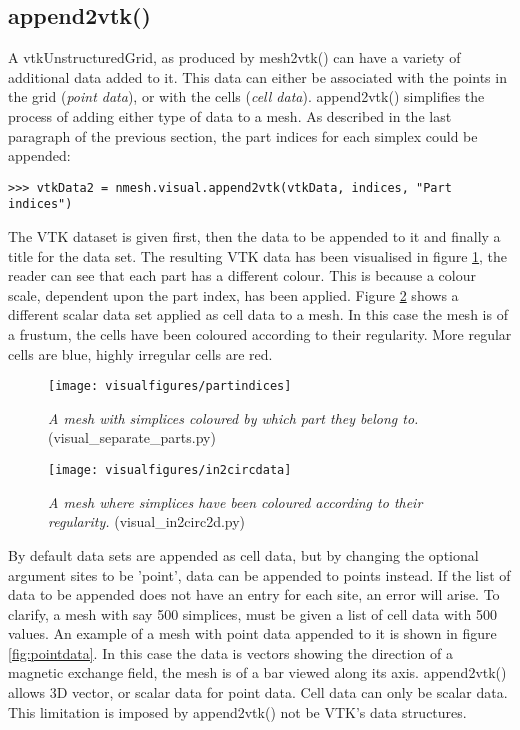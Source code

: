\subsection{{\ttfamily append2vtk()}}
A vtkUnstructuredGrid, as produced by {\ttfamily mesh2vtk()} can have a variety of additional data added to it. This data can either be associated with the points in the grid ({\em point data}), or with the cells ({\em cell data}). {\ttfamily append2vtk()} simplifies the process of adding either type of data to a mesh. As described in the last paragraph of the previous section, the part indices for each simplex could be appended:
\begin{lstlisting}[basicstyle=\small\ttfamily]
>>> vtkData2 = nmesh.visual.append2vtk(vtkData, indices, "Part indices")
\end{lstlisting}
The VTK dataset is given first, then the data to be appended to it and finally a title for the data set. The resulting VTK data has been visualised in figure \ref{fig:partindices}, the reader can see that each part has a different colour. This is because a colour scale, dependent upon the part index, has been applied. Figure \ref{fig:in2circdata} shows a different scalar data set applied as cell data to a mesh. In this case the mesh is of a frustum, the cells have been coloured according to their regularity. More regular cells are blue, highly irregular cells are red.


\begin{figure}
\begin{center}
\texttt{[image: visualfigures/partindices]}
\caption{{\em A mesh with simplices coloured by which part they belong to. }(visual\_separate\_parts.py) \label{fig:partindices}}
\end{center}
\end{figure}


\begin{figure}
\begin{center}
\texttt{[image: visualfigures/in2circdata]}
\caption{{\em A mesh where simplices have been coloured according to their regularity.} (visual\_in2circ2d.py) \label{fig:in2circdata}}
\end{center}
\end{figure}


By default data sets are appended as cell data, but by changing the optional argument {\ttfamily sites} to be {\ttfamily 'point'}, data can be appended to points instead. If the list of data to be appended does not have an entry for each site, an error will arise. To clarify, a mesh with say 500 simplices, must be given a list of cell data with 500 values. An example of a mesh with point data appended to it is shown in figure \ref{fig:pointdata}. In this case the data is vectors showing the direction of a magnetic exchange field, the mesh is of a bar viewed along its axis. {\ttfamily append2vtk()} allows 3D vector, or scalar data for point data. Cell data can only be scalar data. This limitation is imposed by {\ttfamily append2vtk()} not be VTK's data structures.

